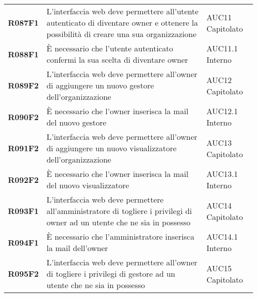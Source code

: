 \documentclass[../analisi-dei-requisiti.tex]{subfiles}
\begin{document}
\begin{longtable}[H]{>{\centering\bfseries}m{3cm} >{\centering}m{10cm} >{\centering\arraybackslash}m{3cm}}
  R087F1                               & L'interfaccia web deve permettere all'utente autenticato di diventare owner e ottenere la possibilità di creare una sua organizzazione                                                                  & AUC11 Capitolato              \\
  R088F1                               & È necessario che l'utente autenticato confermi la sua scelta di diventare owner                                                                                                                         & AUC11.1 Interno               \\
  R089F2                               & L'interfaccia web deve permettere all'owner di aggiungere un nuovo gestore dell'organizzazione                                                                                                          & AUC12 Capitolato              \\
  R090F2                               & È necessario che l'owner inserisca la mail del nuovo gestore                                                                                                                                            & AUC12.1 Interno               \\
  R091F2                               & L'interfaccia web deve permettere all'owner di aggiungere un nuovo visualizzatore dell'organizzazione                                                                                                   & AUC13 Capitolato              \\
  R092F2                               & È necessario che l'owner inserisca la mail del nuovo visualizzatore                                                                                                                                     & AUC13.1 Interno               \\
  R093F1                               & L'interfaccia web deve permettere all'amministratore di togliere i privilegi di owner ad un utente che ne sia in possesso                                                                               & AUC14 Capitolato              \\
  R094F1                               & È necessario che l'amministratore inserisca la mail dell'owner                                                                                                                                          & AUC14.1 Interno               \\
  R095F2                               & L'interfaccia web deve permettere all'owner di togliere i privilegi di gestore ad un utente che ne sia in possesso                                                                                      & AUC15 Capitolato              \\

\end{longtable}
\end{document}
